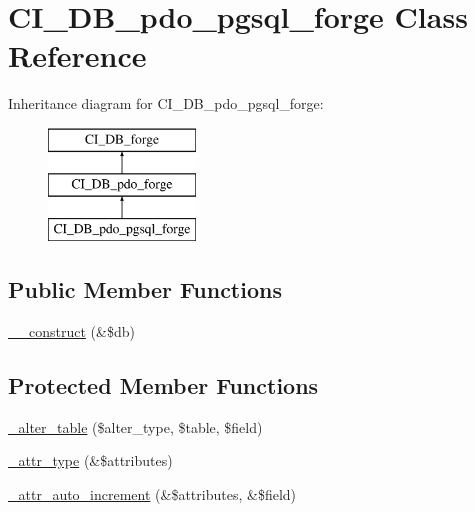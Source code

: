 \hypertarget{class_c_i___d_b__pdo__pgsql__forge}{}\section{C\+I\+\_\+\+D\+B\+\_\+pdo\+\_\+pgsql\+\_\+forge Class Reference}
\label{class_c_i___d_b__pdo__pgsql__forge}
Inheritance diagram for C\+I\+\_\+\+D\+B\+\_\+pdo\+\_\+pgsql\+\_\+forge\+:\begin{figure}[H]
\begin{center}
\leavevmode
\includegraphics[height=3.000000cm]{class_c_i___d_b__pdo__pgsql__forge}
\end{center}
\end{figure}
\subsection*{Public Member Functions}
\begin{DoxyCompactItemize}
\item 
\mbox{\hyperlink{class_c_i___d_b__pdo__pgsql__forge_a7209229a936b502173afb845f1785cbd}{\+\_\+\+\_\+construct}} (\&\$db)
\end{DoxyCompactItemize}
\subsection*{Protected Member Functions}
\begin{DoxyCompactItemize}
\item 
\mbox{\hyperlink{class_c_i___d_b__pdo__pgsql__forge_ad02f3acf5339b6b29110aa1538d5e284}{\+\_\+alter\+\_\+table}} (\$alter\+\_\+type, \$table, \$field)
\item 
\mbox{\hyperlink{class_c_i___d_b__pdo__pgsql__forge_ab69a4363583fa717728923b7b3498657}{\+\_\+attr\+\_\+type}} (\&\$attributes)
\item 
\mbox{\hyperlink{class_c_i___d_b__pdo__pgsql__forge_a70d20475bc68d742285edf8bb7349c50}{\+\_\+attr\+\_\+auto\+\_\+increment}} (\&\$attributes, \&\$field)
\end{DoxyCompactItemize}

